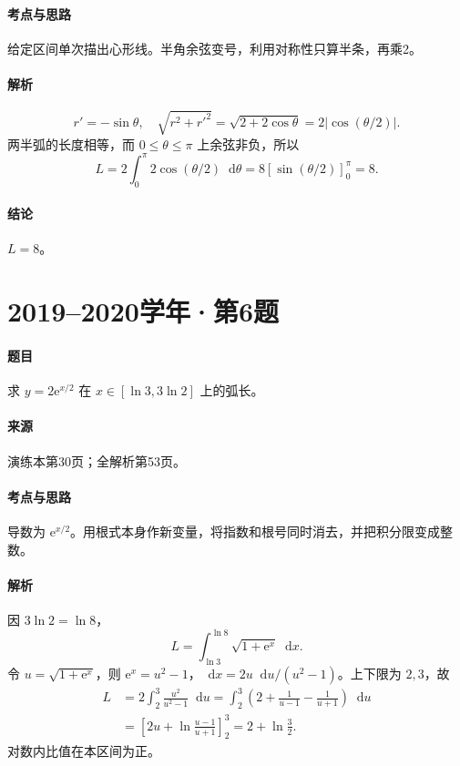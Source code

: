 \documentclass[UTF8,fontset=fandol,12pt,oneside,openany]{ctexrep}
\newcommand{\dd}{\mathop{}\!\mathrm d}
\newcommand{\ee}{\mathrm e}
\theoremstyle{definition}
\begin{document}
\paragraph{考点与思路}给定区间单次描出心形线。半角余弦变号，利用对称性只算半条，再乘2。
\paragraph{解析}
\[
 r'=-\sin\theta,
 \quad \sqrt{r^2+r'^2}=\sqrt{2+2\cos\theta}
 =2|\cos(\theta/2)|.
\]
两半弧的长度相等，而 $0\le\theta\le\pi$ 上余弦非负，所以
\[
 L=2\int_0^\pi2\cos(\theta/2)\dd\theta
 =8[\sin(\theta/2)]_0^\pi=8.
\]
\paragraph{结论}$L=8$。

\par\addvspace{18pt}\noindent\begin{minipage}{\linewidth}
\section{2019--2020学年·第6题}
\paragraph{题目}求 $y=2\ee^{x/2}$ 在 $x\in[\ln3,3\ln2]$ 上的弧长。
\paragraph{来源}演练本第30页；全解析第53页。
\end{minipage}\par
\paragraph{考点与思路}导数为 $\ee^{x/2}$。用根式本身作新变量，将指数和根号同时消去，并把积分限变成整数。
\paragraph{解析}因 $3\ln2=\ln8$，
\[
 L=\int_{\ln3}^{\ln8}\sqrt{1+\ee^x}\dd x.
\]
令 $u=\sqrt{1+\ee^x}$，则 $\ee^x=u^2-1$，$\dd x=2u\dd u/(u^2-1)$。上下限为 $2,3$，故
\begin{align*}
 L&=2\int_2^3\frac{u^2}{u^2-1}\dd u
 =\int_2^3\left(2+\frac1{u-1}-\frac1{u+1}\right)\dd u\\
 &=\left[2u+\ln\frac{u-1}{u+1}\right]_2^3
 =2+\ln\frac32.
\end{align*}
对数内比值在本区间为正。
\end{document}

